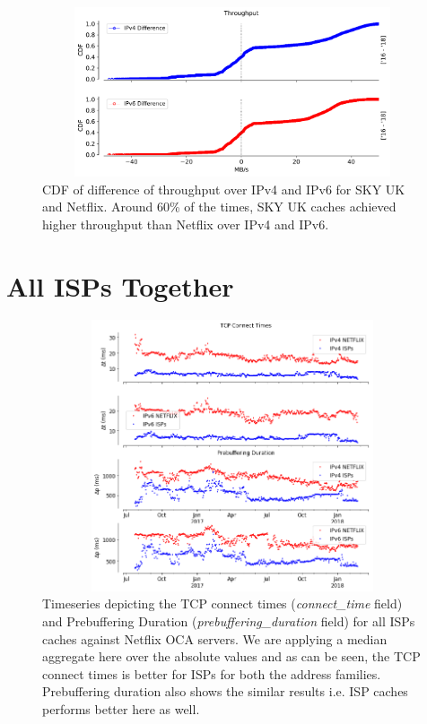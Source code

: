 \begin{figure}[!ht]
	\centering
	\includegraphics[keepaspectratio, height=5cm, width=15cm]{figures/cache/bskyb/netflix-throughput-difference-5607.pdf}
	\caption[SKY UK Throughput CDF Deltas]{CDF of difference of throughput over IPv4 and IPv6 for SKY UK and Netflix. 
Around 60\% of the times, SKY UK caches achieved higher throughput than Netflix over IPv4 and IPv6.}
	\label{fig:SKY UK Throughput CDF Deltas}
\end{figure}

\FloatBarrier

\section{All ISPs Together}

\begin{figure}[!ht]
	\centering
	\includegraphics[keepaspectratio, height=8cm, width=15cm]{figures/cache/allisps/netflix-tcp-pd-delay-timeseries-all-isps-separate.png}
	\caption[All ISPs TCP Connect Times and Pre-Buffering Duration Timeseries Absolute]{Timeseries depicting the TCP connect times (\textit{connect\_time} field) and Prebuffering Duration (\textit{prebuffering\_duration} field) for all ISPs caches against Netflix OCA servers. 
	We are applying a median aggregate here over the absolute values and as can be seen, the TCP connect times is better for ISPs for both the address families. Prebuffering duration also shows the similar
	results i.e. ISP caches performs better here as well.}
	\label{fig:All ISPs TCP Connect Times and Pre-Buffering Duration Timeseries Absolute}
\end{figure}


